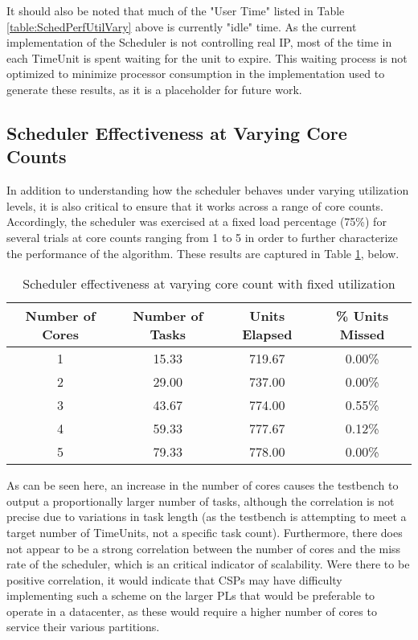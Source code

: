 It should also be noted that much of the "User Time" listed in Table \ref{table:SchedPerfUtilVary} above is currently "idle" time. As the current implementation of the Scheduler is not controlling real IP, most of the time in each TimeUnit is spent waiting for the unit to expire. This waiting process is not optimized to minimize processor consumption in the implementation used to generate these results, as it is a placeholder for future work.

\subsection{Scheduler Effectiveness at Varying Core Counts}\label{subsec:SchedulerDataCoresVary}
In addition to understanding how the scheduler behaves under varying utilization levels, it is also critical to ensure that it works across a range of core counts. Accordingly, the scheduler was exercised at a fixed load percentage (75\%) for several trials at core counts ranging from 1 to 5 in order to further characterize the performance of the algorithm. These results are captured in Table \ref{table:SchedEffectivenessCoresVary}, below.

\begin{table}[ht!]
    \centering\begin{tabular}{| c | c | c | c |}
        \hline
        Number of Cores & Number of Tasks & Units Elapsed & \% Units Missed \\
        \hline
        1 & 15.33 & 719.67 & 0.00\% \\
        2 & 29.00 & 737.00 & 0.00\% \\
        3 & 43.67 & 774.00 & 0.55\% \\
        4 & 59.33 & 777.67 & 0.12\% \\
        5 & 79.33 & 778.00 & 0.00\% \\
        \hline
    \end{tabular}
    \caption{Scheduler effectiveness at varying core count with fixed utilization}
    \label{table:SchedEffectivenessCoresVary}
\end{table}

As can be seen here, an increase in the number of cores causes the testbench to output a proportionally larger number of tasks, although the correlation is not precise due to variations in task length (as the testbench is attempting to meet a target number of TimeUnits, not a specific task count). Furthermore, there does not appear to be a strong correlation between the number of cores and the miss rate of the scheduler, which is an critical indicator of scalability. Were there to be positive correlation, it would indicate that CSPs may have difficulty implementing such a scheme on the larger PLs that would be preferable to operate in a datacenter, as these would require a higher number of cores to service their various partitions.

